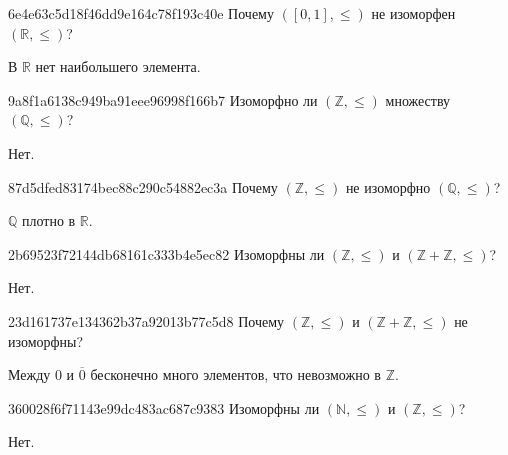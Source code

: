 \begin{note}{6e4e63c5d18f46dd9e164c78f193c40e}
    Почему \({ ([0, 1], \leqslant) }\) не изоморфен \({ (\mathbb R, \leqslant) }\)?

    \begin{cloze}{1}
        В \({ \mathbb R }\) нет наибольшего элемента.
    \end{cloze}
\end{note}

\begin{note}{9a8f1a6138c949ba91eee96998f166b7}
    Изоморфно ли \({ (\mathbb Z, \leqslant) }\) множеству \({ (\mathbb Q, \leqslant) }\)?

    \begin{cloze}{1}
        Нет.
    \end{cloze}
\end{note}

\begin{note}{87d5dfed83174bec88c290c54882ec3a}
    Почему \({ (\mathbb Z, \leqslant) }\) не изоморфно \({ (\mathbb Q, \leqslant) }\)?

    \begin{cloze}{1}
        \({ \mathbb Q }\) плотно в \({ \mathbb R }\).
    \end{cloze}
\end{note}

\begin{note}{2b69523f72144db68161c333b4e5ec82}
    Изоморфны ли \({ (\mathbb Z, \leqslant) }\) и \({ (\mathbb Z + \mathbb Z, \leqslant) }\)?

    \begin{cloze}{1}
        Нет.
    \end{cloze}
\end{note}

\begin{note}{23d161737e134362b37a92013b77c5d8}
    Почему \({ (\mathbb Z, \leqslant) }\) и \({ (\mathbb Z + \mathbb Z, \leqslant) }\) не изоморфны?

    \begin{cloze}{1}
        Между \({ 0 }\) и \({ \overline{0} }\) бесконечно много элементов, что невозможно в \({ \mathbb Z }\).
    \end{cloze}
\end{note}

\begin{note}{360028f6f71143e99dc483ac687c9383}
    Изоморфны ли \({ (\mathbb N, \leqslant) }\) и \({ (\mathbb Z, \leqslant) }\)?

    \begin{cloze}{1}
        Нет.
    \end{cloze}
\end{note}

